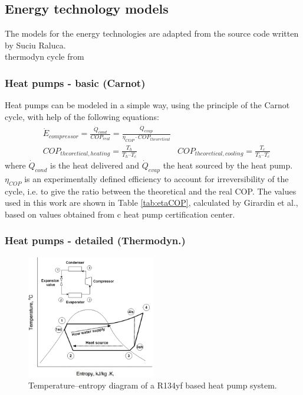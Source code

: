 \documentclass{article}
\begin{document}
\subsection{Energy technology models}\label{ss:et}
The models for the energy technologies are adapted from the source code written by Suciu Raluca.\\
thermodyn cycle from\cite{demierreModelingExperimentalInvestigation2014}\\
\subsubsection{Heat pumps - basic (Carnot)}\label{sss:hp_carnot}
Heat pumps can be modeled in a simple way, using the principle of the Carnot cycle, with help of the following equations:
\begin{align}
    & \dot{E}_{compressor} = \frac{\dot{Q}_{cond}}{COP_{real}} = \frac{\dot{Q}_{evap}}{\eta_{COP} \cdot COP_{theoretical}} \\
    & COP_{theoretical, heating} =  \frac{T_{h}}{T_{h} – T_{c}}  
    & COP_{theoretical, cooling} =  \frac{T_{c}}{T_{h} – T_{c}} 
\end{align}
where $\dot{Q}_{cond}$ is the heat delivered and $\dot{Q}_{evap}$ the heat sourced by the heat pump. $\eta_{COP}$ is an experimentally defined efficiency to account for irreversibility of the cycle, i.e. to give the ratio between the theoretical and the real COP. The values used in this work are shown in Table \ref{tab:etaCOP}, calculated by Girardin et al.\cite{girardinEnerGisGeographicalInformation2010}, based on values obtained from c heat pump certification center\cite{NTBBuchsInstitut}. \\



\subsubsection{Heat pumps - detailed (Thermodyn.)}\label{sss:hp_thermo}

\begin{figure}[htp]
	\centering
	\includegraphics[width=0.5\textwidth]{HP_cylce_ref.png}
	\caption{Temperature–entropy diagram of a R134yf based heat pump system.}
	\label{fig:hp_ref}
\end{figure}
\end{document}
